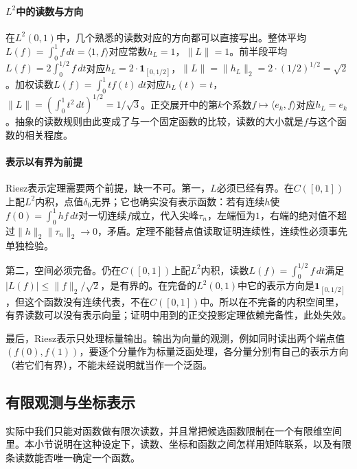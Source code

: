 \paragraph{$L^2$中的读数与方向}
在$L^2(0,1)$中，几个熟悉的读数对应的方向都可以直接写出。整体平均$L(f)=\int_0^1f\,dt=\langle1,f\rangle$对应常数$h_L=1$，$\|L\|=1$。前半段平均$L(f)=2\int_0^{1/2}f\,dt$对应$h_L=2\cdot\mathbf 1_{[0,1/2]}$，$\|L\|=\|h_L\|_2=2\cdot(1/2)^{1/2}=\sqrt2$。加权读数$L(f)=\int_0^1tf(t)\,dt$对应$h_L(t)=t$，$\|L\|=(\int_0^1t^2\,dt)^{1/2}=1/\sqrt3$。正交展开中的第$k$个系数$f\mapsto\langle e_k,f\rangle$对应$h_L=e_k$。抽象的读数规则由此变成了与一个固定函数的比较，读数的大小就是$f$与这个函数的相关程度。

\paragraph{表示以有界为前提}
Riesz表示定理需要两个前提，缺一不可。第一，$L$必须已经有界。在$C([0,1])$上配$L^2$内积，点值$\delta_0$无界；它也确实没有表示函数：若有连续$h$使$f(0)=\int_0^1hf\,dt$对一切连续$f$成立，代入尖峰$\tau_n$，左端恒为$1$，右端的绝对值不超过$\|h\|_2\|\tau_n\|_2\to0$，矛盾。定理不能替点值读取证明连续性，连续性必须事先单独检验。

第二，空间必须完备。仍在$C([0,1])$上配$L^2$内积，读数$L(f)=\int_0^{1/2}f\,dt$满足$|L(f)|\leq\|f\|_2/\sqrt2$，是有界的。在完备的$L^2(0,1)$中它的表示方向是$\mathbf 1_{[0,1/2]}$，但这个函数没有连续代表，不在$C([0,1])$中。所以在不完备的内积空间里，有界读数可以没有表示向量；证明中用到的正交投影定理依赖完备性，此处失效。

最后，Riesz表示只处理标量输出。输出为向量的观测，例如同时读出两个端点值$(f(0),f(1))$，要逐个分量作为标量泛函处理，各分量分别有自己的表示方向（若它们有界），不能未经说明就当作一个泛函。

\subsection{有限观测与坐标表示}
\label{sec:lfo-finite-observations}

实际中我们只能对函数做有限次读数，并且常把候选函数限制在一个有限维空间里。本小节说明在这种设定下，读数、坐标和函数之间怎样用矩阵联系，以及有限条读数能否唯一确定一个函数。

